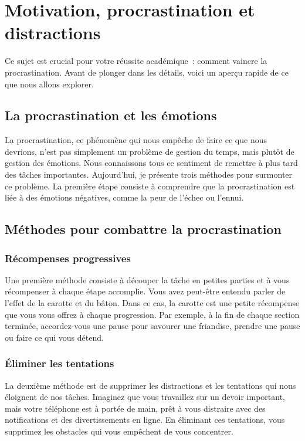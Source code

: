 \documentclass[a4paper, 10pt, garamond]{book}
\begin{document}
\chapter{Motivation, procrastination et distractions}


Ce sujet est crucial pour votre réussite académique~: comment vaincre la
procrastination. Avant de plonger dans les détails, voici un aperçu rapide de ce
que nous allons explorer.

\section{La procrastination et les émotions}

La procrastination, ce phénomène qui nous empêche de faire ce que nous devrions,
n'est pas simplement un problème de gestion du temps, mais plutôt de gestion des
émotions. Nous connaissons tous ce sentiment de remettre à plus tard des tâches
importantes. Aujourd'hui, je présente trois méthodes pour surmonter ce problème.
La première étape consiste à comprendre que la procrastination est liée à des
émotions négatives, comme la peur de l'échec ou l'ennui.

\section{Méthodes pour combattre la procrastination}

\subsection{Récompenses progressives}

Une première méthode consiste à découper la tâche en petites parties et à vous
récompenser à chaque étape accomplie. Vous avez peut-être entendu parler de
l'effet de la carotte et du bâton. Dans ce cas, la carotte est une petite
récompense que vous vous offrez à chaque progression. Par exemple, à la fin de
chaque section terminée, accordez-vous une pause pour savourer une friandise,
prendre une pause ou faire ce qui vous détend.

\subsection{Éliminer les tentations}

La deuxième méthode est de supprimer les distractions et les tentations qui nous
éloignent de nos tâches. Imaginez que vous travaillez sur un devoir important,
mais votre téléphone est à portée de main, prêt à vous distraire avec des
notifications et des divertissements en ligne. En éliminant ces tentations, vous
supprimez les obstacles qui vous empêchent de vous concentrer.
\end{document}
